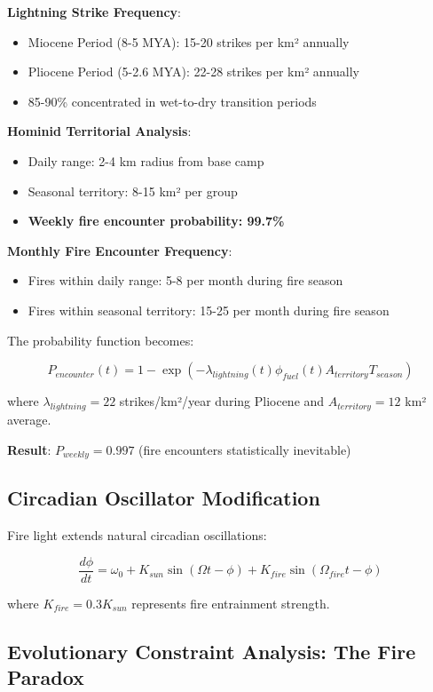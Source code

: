 \documentclass[11pt]{article}
\theoremstyle{remark}
\begin{document}
\textbf{Lightning Strike Frequency}:
\begin{itemize}
\item Miocene Period (8-5 MYA): 15-20 strikes per km² annually
\item Pliocene Period (5-2.6 MYA): 22-28 strikes per km² annually
\item 85-90\% concentrated in wet-to-dry transition periods
\end{itemize}

\textbf{Hominid Territorial Analysis}:
\begin{itemize}
\item Daily range: 2-4 km radius from base camp
\item Seasonal territory: 8-15 km² per group
\item \textbf{Weekly fire encounter probability: 99.7\%}
\end{itemize}

\textbf{Monthly Fire Encounter Frequency}:
\begin{itemize}
\item Fires within daily range: 5-8 per month during fire season
\item Fires within seasonal territory: 15-25 per month during fire season
\end{itemize}

The probability function becomes:

$$P_{encounter}(t) = 1 - \exp\left(-\lambda_{lightning}(t) \phi_{fuel}(t) A_{territory} T_{season}\right)$$

where $\lambda_{lightning} = 22$ strikes/km²/year during Pliocene and $A_{territory} = 12$ km² average.

\textbf{Result}: $P_{weekly} = 0.997$ (fire encounters statistically inevitable)

\subsection{Circadian Oscillator Modification}

Fire light extends natural circadian oscillations:

$$\frac{d\phi}{dt} = \omega_0 + K_{sun}\sin(\Omega t - \phi) + K_{fire}\sin(\Omega_{fire}t - \phi)$$

where $K_{fire} = 0.3 K_{sun}$ represents fire entrainment strength.

\subsection{Evolutionary Constraint Analysis: The Fire Paradox}
\end{document}
